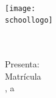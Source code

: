 \begin{titlepage}
    \begin{center}
        \textsc{\school\\[1cm]}
        \texttt{[image: \\schoollogo]}~\\[0.5cm]
        \subschool\\[2cm]
        \subject\\[3cm]
        \Title\\[3cm]
        Presenta: \Author\\
        Matrícula \IDno\\[4cm]
        \city, a \Date
    \end{center}
\end{titlepage}
